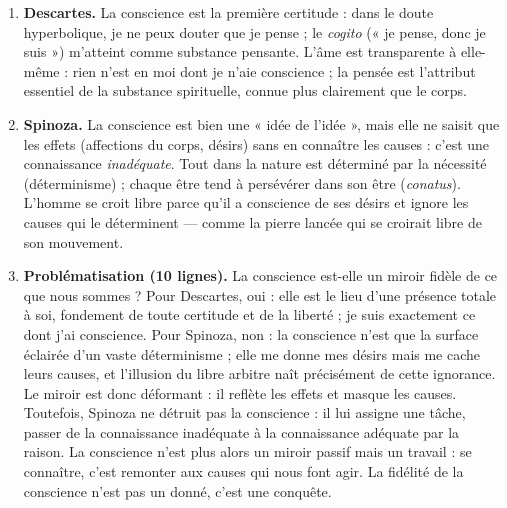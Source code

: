 \documentclass[11pt]{article}
\begin{document}
\begin{corrige}
\begin{enumerate}
\item \textbf{Descartes.} La conscience est la première certitude : dans le doute hyperbolique, je ne peux douter que je pense ; le \emph{cogito} (« je pense, donc je suis ») m'atteint comme substance pensante. L'âme est transparente à elle-même : rien n'est en moi dont je n'aie conscience ; la pensée est l'attribut essentiel de la substance spirituelle, connue plus clairement que le corps.
\item \textbf{Spinoza.} La conscience est bien une « idée de l'idée », mais elle ne saisit que les effets (affections du corps, désirs) sans en connaître les causes : c'est une connaissance \emph{inadéquate}. Tout dans la nature est déterminé par la nécessité (déterminisme) ; chaque être tend à persévérer dans son être (\emph{conatus}). L'homme se croit libre parce qu'il a conscience de ses désirs et ignore les causes qui le déterminent — comme la pierre lancée qui se croirait libre de son mouvement.
\item \textbf{Problématisation (10 lignes).} La conscience est-elle un miroir fidèle de ce que nous sommes ? Pour Descartes, oui : elle est le lieu d'une présence totale à soi, fondement de toute certitude et de la liberté ; je suis exactement ce dont j'ai conscience. Pour Spinoza, non : la conscience n'est que la surface éclairée d'un vaste déterminisme ; elle me donne mes désirs mais me cache leurs causes, et l'illusion du libre arbitre naît précisément de cette ignorance. Le miroir est donc déformant : il reflète les effets et masque les causes. Toutefois, Spinoza ne détruit pas la conscience : il lui assigne une tâche, passer de la connaissance inadéquate à la connaissance adéquate par la raison. La conscience n'est plus alors un miroir passif mais un travail : se connaître, c'est remonter aux causes qui nous font agir. La fidélité de la conscience n'est pas un donné, c'est une conquête.
\end{enumerate}
\end{corrige}
\end{document}
